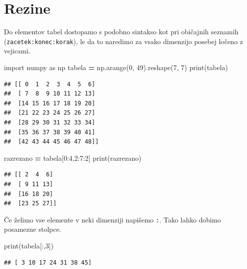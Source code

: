 \documentclass[
]{book}
\newenvironment{Shaded}{\begin{snugshade}}{\end{snugshade}}
\newcommand{\BuiltInTok}[1]{#1}
\newcommand{\DecValTok}[1]{\textcolor[rgb]{0.00,0.00,0.81}{#1}}
\newcommand{\ImportTok}[1]{#1}
\newcommand{\NormalTok}[1]{#1}
\newcommand{\OperatorTok}[1]{\textcolor[rgb]{0.81,0.36,0.00}{\textbf{#1}}}
\begin{document}
\hypertarget{rezine}{%
\section{Rezine}\label{rezine}}

Do elementov tabel dostopamo s podobno sintakso kot pri običajnih seznamih
(\texttt{zacetek:konec:korak}), le da to naredimo za vsako dimenzijo posebej ločeno z vejicami.

\begin{Shaded}
\begin{Highlighting}[]
\ImportTok{import}\NormalTok{ numpy }\ImportTok{as}\NormalTok{ np}
\NormalTok{tabela }\OperatorTok{=}\NormalTok{ np.arange(}\DecValTok{0}\NormalTok{, }\DecValTok{49}\NormalTok{).reshape(}\DecValTok{7}\NormalTok{, }\DecValTok{7}\NormalTok{)}
\BuiltInTok{print}\NormalTok{(tabela)}
\end{Highlighting}
\end{Shaded}

\begin{verbatim}
## [[ 0  1  2  3  4  5  6]
##  [ 7  8  9 10 11 12 13]
##  [14 15 16 17 18 19 20]
##  [21 22 23 24 25 26 27]
##  [28 29 30 31 32 33 34]
##  [35 36 37 38 39 40 41]
##  [42 43 44 45 46 47 48]]
\end{verbatim}

\begin{Shaded}
\begin{Highlighting}[]
\NormalTok{razrezano }\OperatorTok{=}\NormalTok{ tabela[}\DecValTok{0}\NormalTok{:}\DecValTok{4}\NormalTok{,}\DecValTok{2}\NormalTok{:}\DecValTok{7}\NormalTok{:}\DecValTok{2}\NormalTok{]}
\BuiltInTok{print}\NormalTok{(razrezano)}
\end{Highlighting}
\end{Shaded}

\begin{verbatim}
## [[ 2  4  6]
##  [ 9 11 13]
##  [16 18 20]
##  [23 25 27]]
\end{verbatim}

Če želimo vse elemente v neki dimenziji napišemo \texttt{:}. Tako lahko dobimo posamezne stolpce.

\begin{Shaded}
\begin{Highlighting}[]
\BuiltInTok{print}\NormalTok{(tabela[:,}\DecValTok{3}\NormalTok{])}
\end{Highlighting}
\end{Shaded}

\begin{verbatim}
## [ 3 10 17 24 31 38 45]
\end{verbatim}
\end{document}
